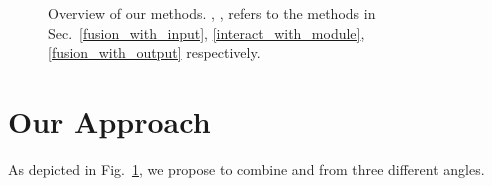 \begin{figure}[!t]
\centering
{}
\hspace{.5in}
\vspace{-3mm}
\caption{Overview of our methods. , ,  refers to the methods in
Sec.~\ref{fusion_with_input}, \ref{interact_with_module}, \ref{fusion_with_output} respectively.}
\label{fig_overview}
\vspace{-5mm}
\end{figure}

\section{Our Approach}
As depicted in Fig.~\ref{fig_overview}, we propose  to combine \NNs and \REs from three different angles.

